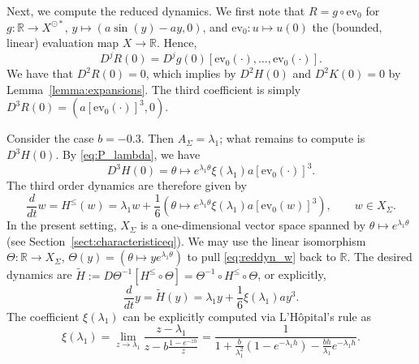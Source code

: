 \documentclass[a4paper, 12pt, oneside, reqno, notitlepage]{amsart}
\theoremstyle{plain}
\theoremstyle{definition}
\theoremstyle{remark}
\begin{document}
Next, we compute the reduced dynamics.
We first note that $R = g \circ \mathrm{ev_0}$ for $g: \mathbb{R} \to X^{\odot{*}}$, $y \mapsto (a\sin(y) - ay,0)$, and $\mathrm{ev}_0: u \mapsto u(0)$ the (bounded, linear) evaluation map $X \to \mathbb{R}$.
Hence,
\begin{displaymath}
    D^jR(0) = D^jg(0) [\mathrm{ev}_0 (\cdot),\ldots,\mathrm{ev}_0(\cdot)].
\end{displaymath}
We have that $D^2R(0) = 0$, which implies by $D^2H(0)$ and $D^2K(0) = 0$ by Lemma~\ref{lemma:expansions}.
The third coefficient is simply $D^3R(0) = (a[\mathrm{ev}_0(\cdot)]^3,0)$.

Consider the case $b = -0.3$.
Then $A_\Sigma = \lambda_1$; what remains to compute is $D^3H(0)$.
By \eqref{eq:P_lambda}, we have
\begin{displaymath}
    D^3H(0) = \theta \mapsto  e^{\lambda_1 \theta} \xi(\lambda_1)  a[\mathrm{ev}_0(\cdot)]^3.
\end{displaymath}
The third order dynamics are therefore given by
\begin{equation}
    \frac{d}{dt} w = H^\leq(w) =\lambda_1w + \frac16 (\theta \mapsto  e^{\lambda_1 \theta} \xi(\lambda_1)  a[\mathrm{ev}_0(w)]^3), \qquad w \in X_\Sigma.
    \label{eq:reddyn_w}
\end{equation}
In the present setting, $X_\Sigma$ is a one-dimensional vector space spanned by $\theta \mapsto e^{\lambda_1 \theta}$ (see Section~\ref{sect:characteristiceq}).
We may use the linear isomorphism $\Theta:\mathbb{R} \to X_\Sigma$,  $\Theta(y) = (\theta \mapsto ye^{\lambda_1 \theta}) $ to pull \eqref{eq:reddyn_w} back to $\mathbb{R}$.
The desired dynamics are $\widetilde{H} := D\Theta^{-1} [H^\leq \circ \Theta] = \Theta^{-1} \circ H^\leq \circ \Theta$, or explicitly,
\begin{equation}
    \frac{d}{dt} y =  \widetilde{H}(y) = \lambda_1 y + \frac16  \xi(\lambda_1)  a y^3.
    \label{eq:reddyn_y}
\end{equation}
The coefficient $\xi(\lambda_1)$ can be explicitly computed via L'Hôpital's rule as
\begin{displaymath}
    \xi(\lambda_1) = \lim_{z \to \lambda_1} \frac{z - \lambda_1}{z - b \frac{1 - e^{-z h}}{z}} = \frac{1}{1+\frac{b}{\lambda_1^2}(1-e^{-\lambda_1h}) - \frac{bh}{\lambda_1}e^{-\lambda_1h}}.
\end{displaymath}
\end{document}
